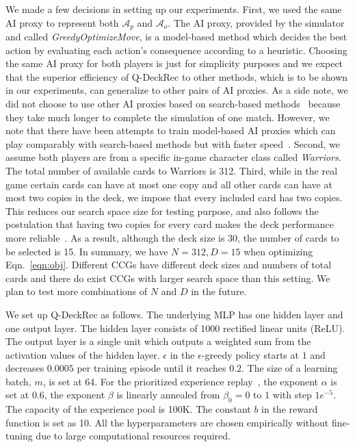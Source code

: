 We made a few decisions in setting up our experiments. First, we used the same AI proxy to represent both $\mathcal{A}_p$ and $\mathcal{A}_o$. The AI proxy, provided by the simulator and called \textit{GreedyOptimizeMove}, is a model-based method which decides the best action by evaluating each action's consequence according to a heuristic. Choosing the same AI proxy for both players is just for simplicity purposes and we expect that the superior efficiency of Q-DeckRec to other methods, which is to be shown in our experiments, can generalize to other pairs of AI proxies. As a side note, we did not choose to use other AI proxies based on  search-based methods~\citep{santos2017monte} because they take much longer to complete the simulation of one match. However, we note that there have been attempts to train model-based AI proxies which can play comparably with search-based methods but with faster speed~\citep{janusz2017helping}. Second, we assume both players are from a specific in-game character class called \textit{Warriors}. The total number of available cards to Warriors is 312. Third, while in the real game certain cards can have at most one copy and all other cards can have at most two copies in the deck, we impose that every included card has two copies. This reduces our search space size for testing purpose, and also follows the postulation that having two copies for every card makes the deck performance more reliable~\citep{garcia2016evolutionary,garcia2018automated}. As a result, although the deck size is 30, the number of cards to be selected is 15. In summary, we have $N=312, D=15$ when optimizing Eqn.~\ref{eqn:obj}. Different CCGs have different deck sizes and numbers of total cards and there do exist CCGs with larger search space than this setting. We plan to test more combinations of $N$ and $D$ in the future.
    
We set up Q-DeckRec as follows. The underlying MLP has one hidden layer and one output layer. The hidden layer consists of 1000 rectified linear units (ReLU). The output layer is a single unit which outputs a weighted sum from the activation values of the hidden layer. $\epsilon$ in the $\epsilon$-greedy policy starts at $1$ and decreases $0.0005$ per training episode until it reaches $0.2$. The size of a learning batch, $m$, is set at 64. For the prioritized experience replay~\citep{schaul2015prioritized}, the exponent $\alpha$ is set at 0.6, the exponent $\beta$ is linearly annealed from $\beta_0=0$ to $1$ with step $1e^{-5}$. The capacity of the experience pool is 100K. The constant $b$ in the reward function is set as 10. All the hyperparameters are chosen empirically without fine-tuning due to large computational resources required.  

